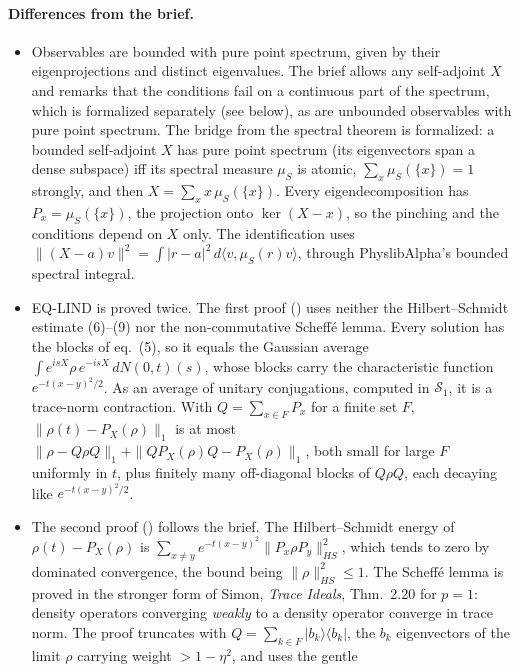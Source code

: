 \documentclass[11pt]{article}
\begin{document}
\paragraph{Differences from the brief.}
\begin{itemize}
\item Observables are bounded with pure point spectrum, given by their eigenprojections and
  distinct eigenvalues. The brief allows any self-adjoint $X$ and remarks that the conditions fail
  on a continuous part of the spectrum, which is formalized separately (see below), as are
  unbounded observables with pure point spectrum. The bridge from the spectral theorem is
  formalized: a bounded
  self-adjoint $X$ has pure point spectrum (its eigenvectors span a dense subspace) iff its
  spectral measure $\mu_S$ is atomic, $\sum_x\mu_S(\{x\}) = 1$ strongly, and then
  $X = \sum_x x\,\mu_S(\{x\})$. Every eigendecomposition has $P_x = \mu_S(\{x\})$, the
  projection onto $\ker(X - x)$, so the pinching and the conditions depend on $X$ only. The
  identification uses $\|(X - a)v\|^2 = \int|r - a|^2\,d\langle v, \mu_S(r) v\rangle$, through
  PhyslibAlpha's bounded spectral integral.
\item EQ-LIND is proved twice. The first proof () uses neither the
  Hilbert--Schmidt estimate (6)--(9) nor the non-commutative Scheff\'e lemma. Every solution has
  the blocks of eq.~(5), so it equals the
  Gaussian average $\int e^{isX}\rho\,e^{-isX}\,dN(0,t)(s)$, whose blocks carry the characteristic
  function $e^{-t(x-y)^2/2}$. As an average of unitary conjugations, computed in
  $\mathcal{S}_1$, it is a trace-norm contraction. With $Q = \sum_{x \in F} P_x$ for a finite set
  $F$, $\|\rho(t) - P_X(\rho)\|_1$ is at most $\|\rho - Q\rho Q\|_1 + \|QP_X(\rho)Q - P_X(\rho)\|_1$,
  both small for large $F$ uniformly in $t$, plus finitely many off-diagonal blocks of
  $Q\rho Q$, each decaying like $e^{-t(x-y)^2/2}$.
\item The second proof () follows the brief. The Hilbert--Schmidt
  energy of $\rho(t) - P_X(\rho)$ is $\sum_{x \ne y} e^{-t(x-y)^2}\|P_x\rho P_y\|_{HS}^2$, which
  tends to zero by dominated convergence, the bound being $\|\rho\|_{HS}^2 \le 1$. The
  Scheff\'e lemma is proved in the stronger form of Simon, \emph{Trace Ideals}, Thm.~2.20 for
  $p = 1$: density operators converging \emph{weakly} to a density operator converge in trace
  norm. The proof truncates with $Q = \sum_{k \in F}|b_k\rangle\langle b_k|$, the $b_k$
  eigenvectors of the limit $\rho$ carrying weight $> 1 - \eta^2$, and uses the gentle

\end{itemize}
\end{document}
